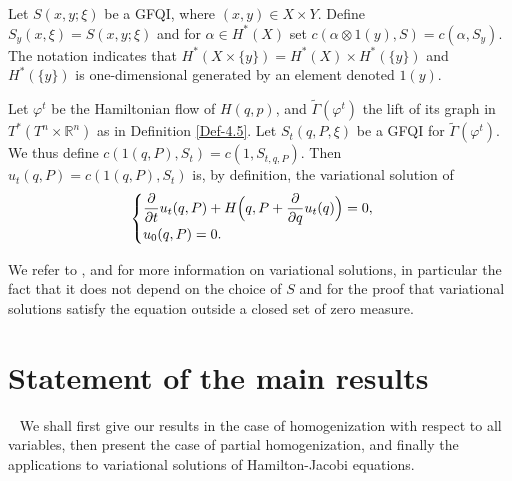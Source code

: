 \documentclass[JEP,XML,SOM,NoFloatCountersInSection,Unicode,published]{cedram}
\numberwithin{equation}{section}
\newcommand{\GFQI}{\textup{GFQI}\xspace}
\let \phi \varphi
\theoremstyle{plain}
\theoremstyle{definition}
\theoremstyle{remark}
\begin{document}
Let $S(x,y;\xi)$ be a \GFQI, where $(x,y)\in X\times Y$. Define $S_y(x,\xi)=S(x,y;\xi)$ and for $\alpha \in H^*(X)$ set $c(\alpha\otimes1(y),S)=c(\alpha, S_y)$. The notation indicates that $H^*(X\times \{y\})=H^*(X) \times H^*(\{y\})$ and $H^*(\{y\})$ is one-dimensional generated by an element denoted $1(y)$.

Let $\phi^{t}$ be the Hamiltonian flow of $H(q,p)$, and ${\widetilde \Gamma} (\phi^{t})$ the lift of its graph in $T^*(T^n\times {\mathbb R}^n)$ as in Definition \ref{Def-4.5}. Let $S_{t}(q,P,\xi)$ be a \GFQI for $\widetilde\Gamma(\phi^{t})$.
We thus define $c(1(q,P), S_{t})=c(1,S_{t,q,P})$. Then $u_{t}(q,P)=c(1(q,P),S_{t})$ is, by definition, the variational solution of
\[
\begin{cases}
\dfrac{\partial}{\partial t}u_{t}(q,P)+H\Bigl(q,P+\dfrac{\partial}{\partial q}u_{t}(q)\Bigr)=0, \\
u_{0}(q,P)=0. \end{cases}
\]

We refer to \cite{Viterbo-Ottolenghi}, \cite{Viterbo-HJ} and \cite{Cardin-Viterbo} for more information on variational solutions, in particular the fact that it does not depend on the choice of $S$ and \cite[App.\,2, Th.\,13.1]{NCMT} for the proof that variational solutions satisfy the equation outside a closed set of zero measure.
\section{Statement of the main results}\label{sec-3}~
We shall first give our results in the case of homogenization with respect to all variables, then present the case of partial homogenization, and finally the
applications to variational solutions of Hamilton-Jacobi equations.

\end{document}
